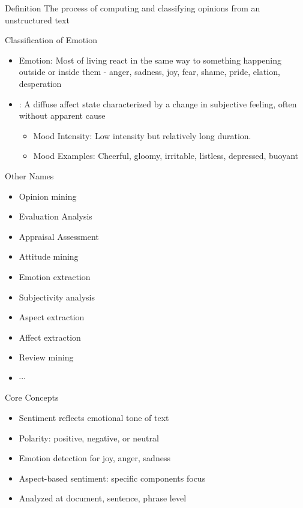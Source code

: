 

\begin{frame}{Definition}
\Huge
The process of computing and classifying opinions from an unstructured text

\end{frame}

\begin{frame}{Classification of Emotion}
\begin{itemize}
\item Emotion: Most of living  react in the same way to something happening outside or inside them -  anger, sadness, joy, fear, shame,
pride, elation, desperation
\item {}: A diffuse affect state characterized by a change in subjective feeling, often without apparent cause
    \begin{itemize}
        \item Mood Intensity: Low intensity but relatively long duration.
        \item Mood Examples: Cheerful, gloomy, irritable, listless, depressed, buoyant
    \end{itemize}
\end{itemize}
\end{frame}
\begin{frame}{Other Names}
\begin{itemize}
\item Opinion mining
\item Evaluation Analysis
\item Appraisal Assessment
\item Attitude mining
\item Emotion extraction
\item Subjectivity analysis
\item Aspect extraction
\item Affect extraction
\item Review mining
\item $\cdots$
\end{itemize}
\end{frame}
\begin{frame}{Core Concepts}
    \begin{itemize}
        \item Sentiment reflects emotional tone of text
        \item Polarity: positive, negative, or neutral
        \item Emotion detection for joy, anger, sadness
        \item Aspect-based sentiment: specific components focus
        \item Analyzed at document, sentence, phrase level
    \end{itemize}
\end{frame}

